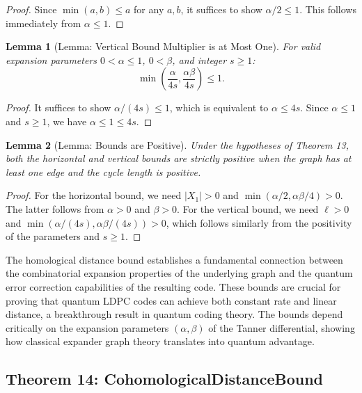 \documentclass[11pt]{article}
\theoremstyle{plain}
\newtheorem*{lemma}{Lemma}
\theoremstyle{definition}
\theoremstyle{remark}
\begin{document}
\begin{proof}
Since $\min(a,b) \leq a$ for any $a,b$, it suffices to show $\alpha/2 \leq 1$. This follows immediately from $\alpha \leq 1$.
\end{proof}

\begin{lemma}[Lemma: Vertical Bound Multiplier is at Most One]
For valid expansion parameters $0 < \alpha \leq 1$, $0 < \beta$, and integer $s \geq 1$:
\[
\min\!\left(\frac{\alpha}{4s}, \frac{\alpha\beta}{4s}\right) \leq 1.
\]
\end{lemma}

\begin{proof}
It suffices to show $\alpha/(4s) \leq 1$, which is equivalent to $\alpha \leq 4s$. Since $\alpha \leq 1$ and $s \geq 1$, we have $\alpha \leq 1 \leq 4s$.
\end{proof}

\begin{lemma}[Lemma: Bounds are Positive]
Under the hypotheses of Theorem 13, both the horizontal and vertical bounds are strictly positive when the graph has at least one edge and the cycle length is positive.
\end{lemma}

\begin{proof}
For the horizontal bound, we need $|X_1| > 0$ and $\min(\alpha/2, \alpha\beta/4) > 0$. The latter follows from $\alpha > 0$ and $\beta > 0$. For the vertical bound, we need $\ell > 0$ and $\min(\alpha/(4s), \alpha\beta/(4s)) > 0$, which follows similarly from the positivity of the parameters and $s \geq 1$.
\end{proof}

The homological distance bound establishes a fundamental connection between the combinatorial expansion properties of the underlying graph and the quantum error correction capabilities of the resulting code. These bounds are crucial for proving that quantum LDPC codes can achieve both constant rate and linear distance, a breakthrough result in quantum coding theory. The bounds depend critically on the expansion parameters $(\alpha, \beta)$ of the Tanner differential, showing how classical expander graph theory translates into quantum advantage.

\vspace{1em}

\subsection{Theorem 14: CohomologicalDistanceBound}
\end{document}
